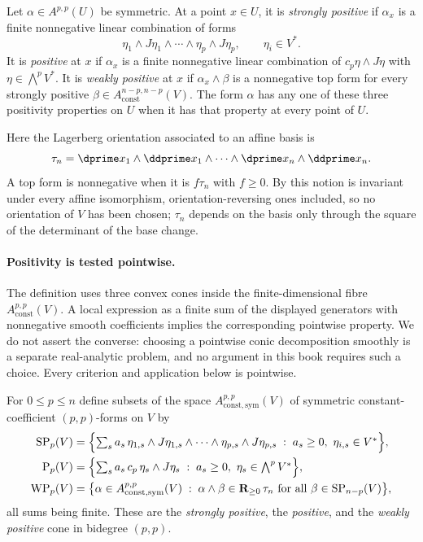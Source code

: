 \begin{definition}
\label{def:ch09-positivity}
Let $\alpha\in A^{p,p}(U)$ be symmetric.  At a point $x\in U$, it is
\emph{strongly positive} if $\alpha_x$ is a finite nonnegative linear
combination of forms
\[
 \eta_1\wedge J\eta_1\wedge\cdots\wedge
 \eta_p\wedge J\eta_p,
 \qquad \eta_i\in V^*.
\]
It is \emph{positive} at $x$ if $\alpha_x$ is a finite nonnegative linear
combination of $c_p\eta\wedge J\eta$ with $\eta\in\bigwedge^pV^*$.  It is
\emph{weakly positive} at $x$ if $\alpha_x\wedge\beta$ is a nonnegative top
form for every strongly positive
$\beta\in A_{\mathrm{const}}^{n-p,n-p}(V)$.  The form $\alpha$ has any one
of these three positivity properties on $U$ when it has that property at
every point of $U$.
\end{definition}

Here the Lagerberg orientation associated to an affine basis is
\[
\tau_n=\dprime x_1\wedge \ddprime x_1\wedge\cdots\wedge \dprime x_n\wedge \ddprime x_n.
\]
A top form is nonnegative when it is $f\tau_n$ with $f\geq0$.
By  this notion is invariant under every affine
isomorphism, orientation-reversing ones included, so no orientation of $V$
has been chosen; $\tau_n$ depends on the basis only through the square of the
determinant of the base change.

\paragraph{Positivity is tested pointwise.}
The definition uses three convex cones inside the finite-dimensional fibre
$A_{\mathrm{const}}^{p,p}(V)$.  A local expression as a finite sum of the
displayed generators with nonnegative smooth coefficients implies the
corresponding pointwise property.  We do not assert the converse: choosing a
pointwise conic decomposition smoothly is a separate real-analytic problem,
and no argument in this book requires such a choice.  Every criterion and
application below is pointwise.

\begin{definition}
\label{def:ch09-cones}
For $0\leq p\leq n$ define subsets of the space
$A_{\mathrm{const},\mathrm{sym}}^{p,p}(V)$ of symmetric constant-coefficient
$(p,p)$-forms on $V$ by
\[
\begin{aligned}
 \mathrm{SP}_p(V)
 &=\Bigl\{\textstyle\sum_{s}a_s\,
    \eta_{1,s}\wedge J\eta_{1,s}\wedge\cdots\wedge
    \eta_{p,s}\wedge J\eta_{p,s}
   \;:\;a_s\geq0,\ \eta_{i,s}\in V^*\Bigr\},\\
 \mathrm{P}_p(V)
 &=\Bigl\{\textstyle\sum_{s}a_s\,c_p\,\eta_s\wedge J\eta_s
   \;:\;a_s\geq0,\ \eta_s\in\bigwedge^pV^*\Bigr\},\\
 \mathrm{WP}_p(V)
 &=\bigl\{\alpha\in A_{\mathrm{const},\mathrm{sym}}^{p,p}(V)\;:\;
   \alpha\wedge\beta\in\mathbf R_{\geq0}\,\tau_n
   \text{ for all }\beta\in\mathrm{SP}_{n-p}(V)\bigr\},
\end{aligned}
\]
all sums being finite.  These are the \emph{strongly positive}, the
\emph{positive}, and the \emph{weakly positive} cone in bidegree $(p,p)$.
\end{definition}

